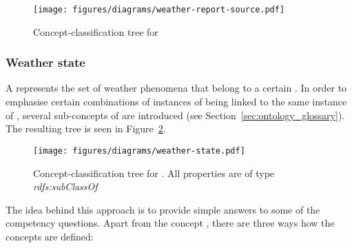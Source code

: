 \begin{figure}
  \centering
  \texttt{[image: figures/diagrams/weather-report-source.pdf]}
  \caption{Concept-classification tree for }
  \label{fig:tree_weather_source}
\end{figure}

\subsubsection{Weather state}

A  represents the set of weather phenomena that belong to a certain . In order to emphasise certain combinations of instances of  being linked to the same instance of , several sub-concepts of  are introduced (see Section~\ref{sec:ontology_glossary}). The resulting tree is seen in Figure~\ref{fig:tree_weather_state}.

\begin{figure}
  \centering
  \texttt{[image: figures/diagrams/weather-state.pdf]}
  \caption{Concept-classification tree for . All properties are of type \emph{rdfs:subClassOf}}
  \label{fig:tree_weather_state}
\end{figure}

The idea behind this approach is to provide simple answers to some of the competency questions. Apart from the concept , there are three ways how the concepts are defined:

